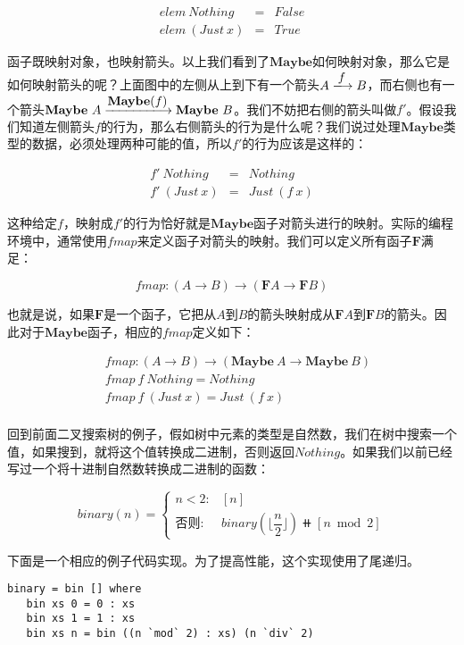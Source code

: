 \documentclass{article}
\begin{document}
\begin{example}
\[
\begin{array}{lcl}
elem\ Nothing & = & False \\
elem\ (Just\ x) & = & True
\end{array}
\]

函子既映射对象，也映射箭头。以上我们看到了$\mathbf{Maybe}$如何映射对象，那么它是如何映射箭头的呢？上面图中的左侧从上到下有一个箭头$A \arrowto{f} B$，而右侧也有一个箭头$\mathbf{Maybe}\ A \arrowto{\mathbf{Maybe}(f)} \mathbf{Maybe}\ B$。我们不妨把右侧的箭头叫做$f'$。假设我们知道左侧箭头$f$的行为，那么右侧箭头的行为是什么呢？我们说过处理$\mathbf{Maybe}$类型的数据，必须处理两种可能的值，所以$f'$的行为应该是这样的：

\[
\begin{array}{lcl}
f'\ Nothing & = & Nothing \\
f'\ (Just\ x) & = & Just\ (f\ x)
\end{array}
\]

这种给定$f$，映射成$f'$的行为恰好就是$\mathbf{Maybe}$函子对箭头进行的映射。实际的编程环境中，通常使用$fmap$来定义函子对箭头的映射。我们可以定义所有函子$\mathbf{F}$满足：

\[
fmap : (A \to B) \to (\mathbf{F} A \to \mathbf{F} B)
\]

也就是说，如果$\mathbf{F}$是一个函子，它把从$A$到$B$的箭头映射成从$\mathbf{F} A$到$\mathbf{F} B$的箭头。因此对于$\mathbf{Maybe}$函子，相应的$fmap$定义如下：

\[
\begin{array}{l}
\quad    fmap : (A \to B) \to (\mathbf{Maybe}\ A \to \mathbf{Maybe}\ B) \\
\quad    fmap\ f\ Nothing = Nothing \\
\quad    fmap\ f\ (Just\ x) = Just\ (f\ x) \\
\end{array}
\]

回到前面二叉搜索树的例子，假如树中元素的类型是自然数，我们在树中搜索一个值，如果搜到，就将这个值转换成二进制，否则返回$Nothing$。如果我们以前已经写过一个将十进制自然数转换成二进制的函数：

\[
binary(n) = \begin{cases}
n < 2: & [n] \\
\text{否则}: & binary(\lfloor\dfrac{n}{2}\rfloor)\doubleplus[n \bmod 2]
\end{cases}
\]

下面是一个相应的例子代码实现。为了提高性能，这个实现使用了尾递归。

\lstset{frame=single}
\begin{lstlisting}[style=Haskell]
binary = bin [] where
   bin xs 0 = 0 : xs
   bin xs 1 = 1 : xs
   bin xs n = bin ((n `mod` 2) : xs) (n `div` 2)
\end{lstlisting}


\end{example}
\end{document}
